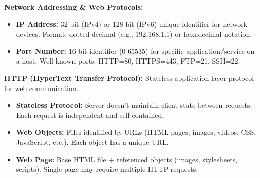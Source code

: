 \hspace{-20px}
\begin{minipage}[htp]{0.5\textwidth}
    \noindent\textbf{Network Addressing \& Web Protocols:}
    \begin{itemize}[noitemsep,nolistsep,topsep=0px,partopsep=0pt,parsep=0pt]
        \item[-] \textbf{IP Address:} 32-bit (IPv4) or 128-bit (IPv6) unique identifier for network devices. Format: dotted decimal (e.g., 192.168.1.1) or hexadecimal notation.
        \item[-] \textbf{Port Number:} 16-bit identifier (0-65535) for specific application/service on a host. Well-known ports: HTTP=80, HTTPS=443, FTP=21, SSH=22.
    \end{itemize} 
    \noindent\textbf{HTTP (HyperText Transfer Protocol):} Stateless application-layer protocol for web communication.
    \begin{itemize}[noitemsep,nolistsep,topsep=0px,partopsep=0pt,parsep=0pt]
        \item[-] \textbf{Stateless Protocol:} Server doesn't maintain client state between requests. Each request is independent and self-contained.
        \item[-] \textbf{Web Objects:} Files identified by URLs (HTML pages, images, videos, CSS, JavaScript, etc.). Each object has a unique URL.
        \item[-] \textbf{Web Page:} Base HTML file + referenced objects (images, stylesheets, scripts). Single page may require multiple HTTP requests.
        

\end{itemize}
\end{minipage}
